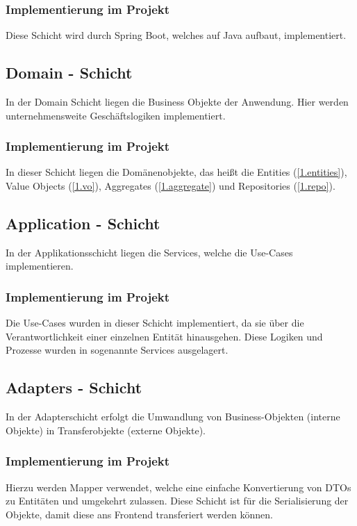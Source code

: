     		\subsubsection{Implementierung im Projekt}
    		Diese Schicht wird durch Spring Boot, welches auf Java aufbaut, implementiert. 
    	
    	\subsection{Domain - Schicht}
    	In der Domain Schicht liegen die Business Objekte der Anwendung. Hier werden unternehmensweite Geschäftslogiken implementiert.
    		\subsubsection{Implementierung im Projekt}
    		In dieser Schicht liegen die Domänenobjekte, das heißt die Entities (\cref{1.entities}), Value Objects (\cref{1.vo}), Aggregates (\cref{1.aggregate}) und Repositories (\cref{1.repo}).
    	
    	\subsection{Application - Schicht}
    	In der Applikationsschicht liegen die Services, welche die Use-Cases implementieren.
    		\subsubsection{Implementierung im Projekt}
    		Die Use-Cases wurden in dieser Schicht implementiert, da sie über die Verantwortlichkeit einer einzelnen Entität hinausgehen. Diese Logiken und Prozesse wurden in sogenannte Services ausgelagert.
    	
    	\subsection{Adapters - Schicht}
    	In der Adapterschicht erfolgt die Umwandlung von Business-Objekten (interne Objekte) in Transferobjekte (externe Objekte).
    		\subsubsection{Implementierung im Projekt}
    		Hierzu werden Mapper verwendet, welche eine einfache Konvertierung von DTOs zu Entitäten und umgekehrt zulassen. Diese Schicht ist für die Serialisierung der Objekte, damit diese ans Frontend transferiert werden können.
    		
